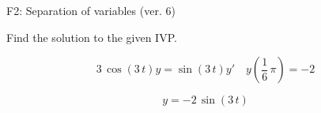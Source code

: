 \begin{exercise}
  \begin{exerciseTitle}F2: Separation of variables (ver. 6)\end{exerciseTitle}
  \begin{exerciseStatement}
    
Find the solution to the given IVP.

    
\[3 \, \cos\left(3 \, t\right) y= \sin\left(3 \, t\right) y'\hspace{1em} y\left( \frac{1}{6} \, \pi \right)= -2\]

  \end{exerciseStatement}
  \begin{exerciseAnswer}
    
\[y= -2 \, \sin\left(3 \, t\right)\]

  \end{exerciseAnswer}
\end{exercise}